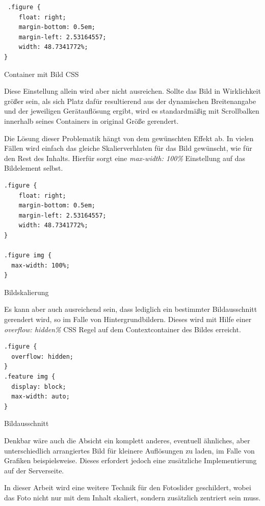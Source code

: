 \begin{listing}[H]
\begin{verbatim}
 .figure {
    float: right;
    margin-bottom: 0.5em;
    margin-left: 2.53164557;
    width: 48.7341772%;
}
\end{verbatim}
\caption{Container mit Bild CSS}
\label{lst:image_container_css}
\end{listing}

Diese Einstellung allein wird aber nicht ausreichen. Sollte das Bild in Wirklichkeit größer sein, als sich Platz dafür resultierend aus der dynamischen Breitenangabe und der jeweiligen Gerätauflösung ergibt, wird es standardmäßig mit Scrollbalken innerhalb seines Containers in original Größe gerendert.

Die Lösung dieser Problematik hängt von dem gewünschten Effekt ab. In vielen Fällen wird einfach das gleiche Skalierverhlaten für das Bild gewünscht, wie für den Rest des Inhalts. Hierfür sorgt eine \emph{max-width: 100\%} Einstellung auf das Bildelement selbst.

\begin{listing}[H]
\begin{verbatim}
.figure {
    float: right;
    margin-bottom: 0.5em;
    margin-left: 2.53164557;
    width: 48.7341772%;
}

.figure img {
  max-width: 100%;
}
\end{verbatim}
\caption{Bildskalierung}
\label{lst:scalable_image}
\end{listing}


Es kann aber auch ausreichend sein, dass lediglich ein bestimmter Bildausschnitt gerendert wird, so im Falle von Hintergrundbildern. Dieses wird mit Hilfe einer \emph{overflow: hidden\%} CSS Regel auf dem Contextcontainer des Bildes erreicht.

\begin{listing}[H]
\begin{verbatim}
.figure {
  overflow: hidden;
}
.feature img {
  display: block;
  max-width: auto;
}
\end{verbatim}
\caption{Bildausschnitt}
\label{lst:cropped_image}
\end{listing}

Denkbar wäre auch die Absicht ein komplett anderes, eventuell ähnliches, aber unterschiedlich arrangiertes Bild für kleinere Auflösungen zu laden, im Falle von Grafiken beispielsweise. Dieses erfordert jedoch eine zusätzliche Implementierung auf der Serverseite.

In dieser Arbeit wird eine weitere Technik für den Fotoslider geschildert, wobei das Foto nicht nur mit dem Inhalt skaliert, sondern zusätzlich zentriert sein muss.


